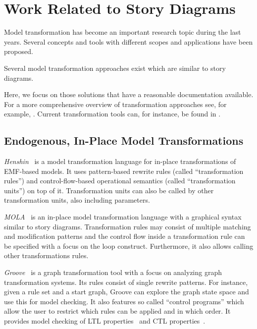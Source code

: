 \section{Work Related to Story Diagrams}
\label{sec:RW_RelatedWork}

Model transformation has become an important research topic during the last years.
Several concepts and tools with different scopes and applications have been proposed.

Several model transformation approaches exist which are similar to story diagrams.

Here, we focus on those solutions that have a reasonable documentation available.
For a more comprehensive overview of transformation approaches see, for example, \cite{Czarnecki06}.
Current transformation tools can, for instance, be found in \cite{TTC2010}.

\subsection{Endogenous, In-Place Model Transformations}

\emph{Henshin}~\cite{henshin2} is a model transformation language for in-place transformations of EMF-based models.
It uses pattern-based rewrite rules (called ``transformation rules'') and control-flow-based operational semantics (called ``transformation units'') on top of it.
Transformation units can also be called by other transformation units, also including parameters.

\emph{MOLA}~\cite{mola} is an in-place model transformation language with a graphical syntax similar to story diagrams.
Transformation rules may consist of multiple matching and modification patterns and the control flow inside a transformation rule can be specified with a focus on the loop construct.
Furthermore, it also allows calling other transformations rules. %

\emph{Groove}~\cite{Ren04a} is a graph transformation tool with a focus on analyzing graph transformation systems.
Its rules consist of single rewrite patterns.
For instance, given a rule set and a start graph, Groove can explore the graph state space and use this for model checking.
It also features so called ``control programs'' which allow the user to restrict which rules can be applied and in which order. It provides model checking of LTL properties~\cite{Ren08} and CTL properties~\cite{KR06}.

